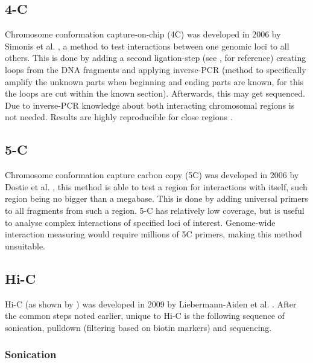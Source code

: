 \subsection{4-C}\label{sec:4C}

Chromosome conformation capture-on-chip (4C) was developed in 2006 by Simonis
et al. \cite{simonis2006nuclear}, a method to test interactions between
one genomic loci to all others. This is done by adding a second ligation-step
(see ,  for reference) creating loops from
the DNA fragments and applying inverse-PCR (method to specifically amplify the
unknown parts when beginning and ending parts are known, for this the loops are
cut within the known section). Afterwards, this may get sequenced. Due to
inverse-PCR knowledge about both interacting chromosomal regions is not needed.
Results are highly reproducible for close regions .




\subsection{5-C}\label{sec:5C}

Chromosome conformation capture carbon copy (5C) was developed in 2006 by
Dostie et al. \cite{dostie2006chromosome}, this method is able to test a region
for interactions with itself, such region being no bigger than a megabase. This
is done by adding universal primers to all fragments from such a region.
5-C has relatively low coverage, but is useful to analyse complex interactions
of specified loci of interest. Genome-wide interaction measuring would require
millions of 5C primers, making this method unsuitable.







\subsection{Hi-C}\label{sec:HiC}

Hi-C (as shown by ) was developed in 2009 by Liebermann-Aiden et al.
\cite{lieberman2009comprehensive}. After the common steps noted earlier, unique
to Hi-C is the following sequence of sonication, pulldown (filtering based on
biotin markers) and sequencing.


\subsubsection{Sonication}\label{sec:sonication}

